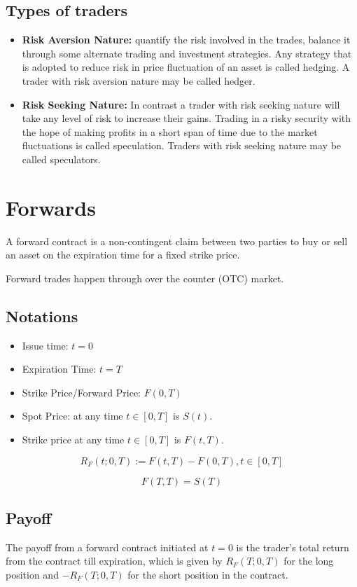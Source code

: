 \documentclass{report}
\begin{document}
\subsection{Types of traders}
\begin{itemize}
    \item {\bf Risk Aversion Nature:} quantify the risk involved in the trades, balance it through some alternate trading and investment strategies. Any strategy that is adopted to reduce risk in price fluctuation of an asset is called hedging. A trader with risk aversion nature may be called hedger.
    \item {\bf Risk Seeking Nature:} In contrast a trader with risk seeking nature will take any level of risk to increase their gains. Trading in a risky security with the hope of making profits in a short span of time due to the market fluctuations is called speculation. Traders with risk seeking nature may be called speculators.
\end{itemize}

\section{Forwards}
A forward contract is a non-contingent claim between two parties to buy or sell an asset on the expiration time for a fixed strike price.


Forward trades happen through over the counter (OTC) market.
\subsection{Notations}
\begin{itemize}
    \item Issue time: $t = 0$
    \item Expiration Time: $t=T$
    \item Strike Price/Forward Price: $F(0, T)$
    \item Spot Price: at any time $t \in [0,T]$ is $S(t)$.
    \item Strike price at any time $t \in [0,T]$ is $F(t, T)$.
\end{itemize}


\[
R_F(t; 0, T) := F(t,T)-F(0,T),    t \in [0,T]
\]

\[F(T,T) = S(T)\]


\subsection{Payoff}
The payoff from a forward contract initiated at $t = 0$ is the trader's total return from the contract till expiration, which is given by $R_F(T; 0, T)$ for the long position and $-R_F(T; 0, T)$ for the short position in the contract. 
\end{document}
